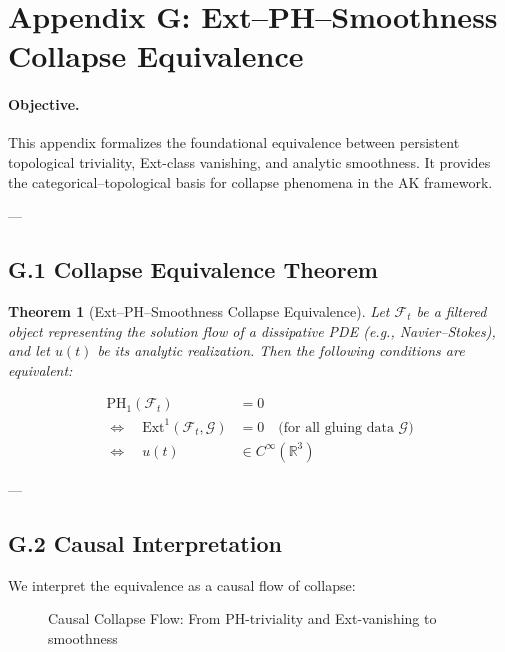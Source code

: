 \documentclass[11pt]{article}
\newtheorem{theorem}{Theorem}[section]
\begin{document}

\section*{Appendix G: Ext–PH–Smoothness Collapse Equivalence}

\paragraph{Objective.}  
This appendix formalizes the foundational equivalence between persistent topological triviality, Ext-class vanishing, and analytic smoothness.  
It provides the categorical–topological basis for collapse phenomena in the AK framework.

---

\subsection*{G.1 Collapse Equivalence Theorem}

\begin{theorem}[Ext–PH–Smoothness Collapse Equivalence]
Let $\mathcal{F}_t$ be a filtered object representing the solution flow of a dissipative PDE (e.g., Navier–Stokes), and let $u(t)$ be its analytic realization.  
Then the following conditions are equivalent:

\begin{align*}
\mathrm{PH}_1(\mathcal{F}_t) &= 0 \\
\iff \quad \mathrm{Ext}^1(\mathcal{F}_t, \mathcal{G}) &= 0 \quad \text{(for all gluing data } \mathcal{G}) \\
\iff \quad u(t) &\in C^\infty(\mathbb{R}^3)
\end{align*}

\end{theorem}

---

\subsection*{G.2 Causal Interpretation}

We interpret the equivalence as a causal flow of collapse:

\begin{figure}[htbp]
\centering
{}
\caption{Causal Collapse Flow: From PH-triviality and Ext-vanishing to smoothness}
\end{figure}
\end{document}
